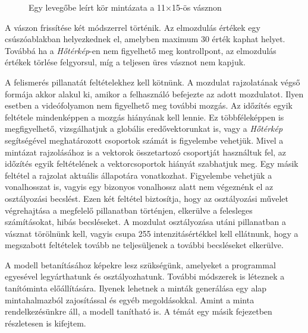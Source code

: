 \begin{figure}[h]
\centering
{}
\caption{Egy levegőbe leírt kör mintázata a 11$\times$15-ös vásznon}
\label{fig:ocr-gesture}
\end{figure}

A vászon frissítése két módszerrel történik. Az elmozdulás értékek egy csúszóablakban helyezkednek el, amelyben maximum  30 érték kaphat helyet. Továbbá ha a \textit{Hőtérkép}-en nem figyelhető meg kontrollpont, az elmozdulás értékek törlése felgyorsul, míg a teljesen üres vásznot nem kapjuk.

A felismerés pillanatát feltételekhez kell kötnünk. A mozdulat rajzolatának végső formája akkor alakul ki, amikor a felhasználó befejezte az adott mozdulatot. Ilyen esetben a videófolyamon nem figyelhető meg további mozgás. Az időzítés egyik feltétele mindenképpen a mozgás hiányának kell lennie. Ez többféleképpen is megfigyelhető, vizsgálhatjuk a globális eredővektorunkat is, vagy a \textit{Hőtérkép} segítségével meghatározott csoportok számát is figyelembe vehetjük. Mivel a mintázat rajzolásához is a vektorok összetartozó csoportját használtuk fel, az időzítés egyik feltételének a vektorcsoportok hiányát szabhatjuk meg. Egy másik feltétel a rajzolat aktuális állapotára vonatkozhat. Figyelembe vehetjük a vonalhosszat is, vagyis egy bizonyos vonalhossz alatt nem végeznénk el az osztályozási becslést. Ezen két feltétel biztosítja, hogy az osztályozási művelet végrehajtása a megfelelő pillanatban történjen, elkerülve a felesleges számításokat, hibás becsléseket.
A mozdulat osztályozása utáni pillanatban a vásznat törölnünk kell, vagyis csupa 255 intenzitásértékkel kell ellátnunk, hogy a megszabott feltételek tovább ne teljesüljenek a további becsléseket elkerülve.

A modell betanításához képekre lesz szükségünk, amelyeket a programmal egyesével legyárthatunk és osztályozhatunk. További módszerek is léteznek a tanítóminta előállítására. Ilyenek lehetnek a minták generálása egy alap mintahalmazból zajosítással és egyéb megoldásokkal. Amint a minta rendelkezésünkre áll, a modell tanítható is. A témát egy másik fejezetben részletesen is kifejtem.
